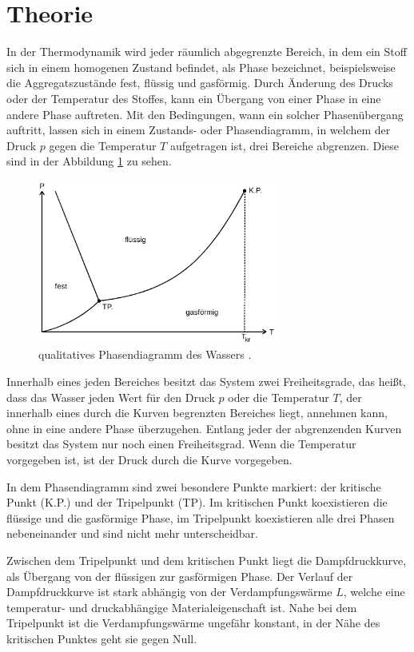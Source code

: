 \section{Theorie}
\label{sec:Theorie}
In der Thermodynamik wird jeder räumlich abgegrenzte Bereich, in dem ein Stoff
sich in einem homogenen Zustand befindet, als Phase bezeichnet, beispielsweise
die Aggregatszustände fest, flüssig und gasförmig. Durch Änderung des Drucks oder
der Temperatur des Stoffes, kann ein Übergang von einer Phase in eine andere
Phase auftreten. Mit den Bedingungen, wann ein solcher Phasenübergang auftritt,
lassen sich in einem Zustands- oder Phasendiagramm, in welchem der Druck $p$
gegen die Temperatur $T$ aufgetragen ist, drei Bereiche abgrenzen. Diese sind in
der Abbildung \ref{fig:phasendiagramm} zu sehen.
\begin{figure}[H]
  \centering
  \includegraphics[width=0.7\textwidth]{phasendiagramm.png}
  \caption{qualitatives Phasendiagramm des Wassers \cite{sample}.}
  \label{fig:phasendiagramm}
\end{figure}
\noindent Innerhalb eines jeden Bereiches besitzt das System zwei Freiheitsgrade,
das heißt, dass das Wasser jeden Wert für den Druck $p$ oder die Temperatur $T$,
der innerhalb eines durch die Kurven begrenzten Bereiches liegt, annehmen kann,
ohne in eine andere Phase überzugehen. Entlang jeder der abgrenzenden Kurven
besitzt das System nur noch einen Freiheitsgrad. Wenn die Temperatur vorgegeben
ist, ist der Druck durch die Kurve vorgegeben.

In dem Phasendiagramm sind zwei besondere Punkte markiert: der kritische Punkt
(K.P.) und der Tripelpunkt (TP). Im kritischen Punkt koexistieren die flüssige
und die gasförmige Phase, im Tripelpunkt koexistieren alle drei Phasen nebeneinander
und sind nicht mehr unterscheidbar.

Zwischen dem Tripelpunkt und dem kritischen Punkt liegt die Dampfdruckkurve, als
Übergang von der flüssigen zur gasförmigen Phase. Der Verlauf der Dampfdruckkurve
ist stark abhängig von der Verdampfungswärme $L$, welche eine temperatur- und
druckabhängige Materialeigenschaft ist. Nahe bei dem Tripelpunkt ist die
Verdampfungswärme ungefähr konstant, in der Nähe des kritischen Punktes geht sie
gegen Null.

